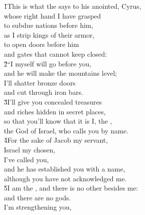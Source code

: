 \begin{poetry}
\poeml {}
\v{1}This is what the  says to his anointed, Cyrus, \\
\poemll    whose right hand I have grasped \\
\poeml to subdue nations before him, \\
\poemll    as I strip kings of their armor, \\
\poeml to open doors before him \\
\poemll    and gates that cannot keep closed: \\
\poeml \v{2}``I myself will go before you, \\
\poemll    and he will make the mountains level; \\
\poeml I'll shatter bronze doors \\
\poemll    and cut through iron bars. \\
\poeml \v{3}I'll give you concealed treasures \\
\poemll    and riches hidden in secret places, \\
\poeml so that you'll know that it is I, the , \\
\poemll    the God of Israel, who calls you by name. \\
\poeml \v{4}For the sake of Jacob my servant, \\
\poemll    Israel my chosen, \\
\poeml I've called you, \\
\poemll    and he has established you with a name, \\
\poemlll       although you have not acknowledged me. \\
\poeml \v{5}I am the , and there is no other besides me: \\
\poemll    and there are no gods. \\
\poeml I'm strengthening you, \\

\end{poetry}
